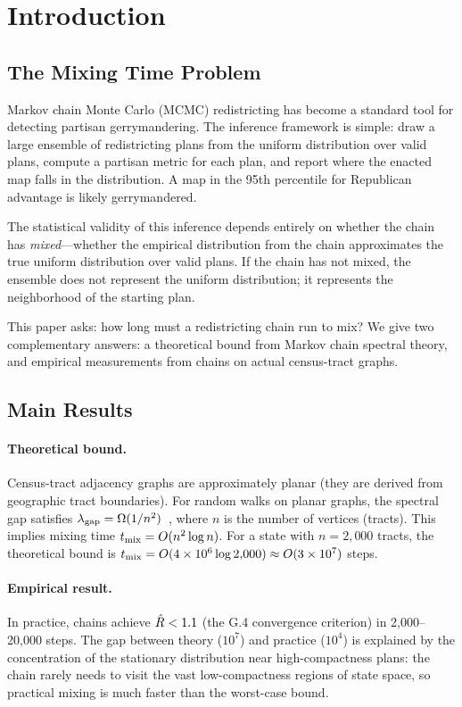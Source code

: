 \section{Introduction}
\label{sec:introduction}

\subsection{The Mixing Time Problem}

Markov chain Monte Carlo (MCMC) redistricting has become a standard tool
for detecting partisan gerrymandering.
The inference framework is simple: draw a large ensemble of redistricting
plans from the uniform distribution over valid plans, compute a partisan
metric for each plan, and report where the enacted map falls in the
distribution.
A map in the 95th percentile for Republican advantage is likely gerrymandered.

The statistical validity of this inference depends entirely on whether the
chain has \emph{mixed}---whether the empirical distribution from the chain
approximates the true uniform distribution over valid plans.
If the chain has not mixed, the ensemble does not represent the uniform
distribution; it represents the neighborhood of the starting plan.

This paper asks: how long must a redistricting chain run to mix?
We give two complementary answers: a theoretical bound from Markov chain
spectral theory, and empirical measurements from \recom{} chains on
actual census-tract graphs.

\subsection{Main Results}

\paragraph{Theoretical bound.}
Census-tract adjacency graphs are approximately planar (they are derived
from geographic tract boundaries).
For random walks on planar graphs, the spectral gap satisfies
$\lambda_{\mathrm{gap}} = \Omega(1/n^2)$~\citep{lipton1979,levin2009}, where $n$ is the
number of vertices (tracts).
This implies mixing time $t_{\mathrm{mix}} = O(n^2 \log n)$.
For a state with $n = 2{,}000$ tracts, the theoretical bound is
$t_{\mathrm{mix}} = O(4 \times 10^6 \log 2{,}000) \approx O(3 \times 10^7)$ steps.

\paragraph{Empirical result.}
In practice, \recom{} chains achieve $\hat{R} < 1.1$ (the G.4 convergence
criterion) in 2{,}000--20{,}000 steps.
The gap between theory ($10^7$) and practice ($10^4$) is explained by the
concentration of the stationary distribution near high-compactness plans:
the chain rarely needs to visit the vast low-compactness regions of state
space, so practical mixing is much faster than the worst-case bound.

